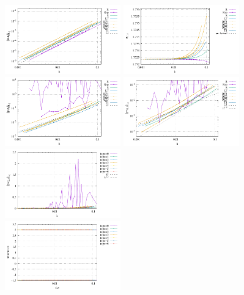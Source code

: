\begin{center}
\includegraphics[width=5cm]{python_codes/fieldstone_78/results/errors_u_exp9.pdf}
\includegraphics[width=5cm]{python_codes/fieldstone_78/results/vrms_exp9.pdf} \\
\includegraphics[width=5cm]{python_codes/fieldstone_78/results/errors_p_exp9.pdf}
\includegraphics[width=5cm]{python_codes/fieldstone_78/results/errors_q1_exp9.pdf}
\includegraphics[width=5cm]{python_codes/fieldstone_78/results/errors_q2_exp9.pdf}\\
\includegraphics[width=5cm]{python_codes/fieldstone_78/results/stats_u_exp9.pdf}

\end{center}
